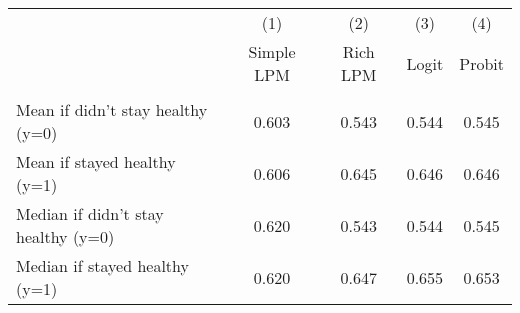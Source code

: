     \begin{tabular}{lcccc} \hline
     & (1) & (2) & (3) & (4) \\
     & Simple LPM & Rich LPM & Logit & Probit \\ \hline
     &  &  $ $ \\
    Mean if didn't stay healthy (y=0) & 0.603 & 0.543 & 0.544 & 0.545 \\
    Mean if stayed healthy (y=1) & 0.606 & 0.645 & 0.646 & 0.646 \\  \hline
    Median if didn't stay healthy (y=0) & 0.620 & 0.543 & 0.544 & 0.545 \\
    Median if stayed healthy (y=1) & 0.620 & 0.647 & 0.655 & 0.653 \\  \hline
    \end{tabular}